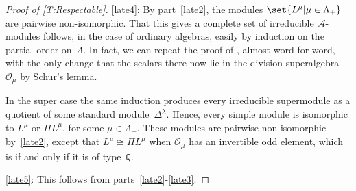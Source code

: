 \documentclass[a4paper,11pt]{amsart}
\numberwithin{equation}{subsection}
\theoremstyle{definition}
\theoremstyle{theorem}
\theoremstyle{remark}
\newcommand\CA{\mathcal{A}}
\newcommand\CO{\mathcal{O}}
\newcommand\Olam[1][\lambda]{\CO_{#1}}
\begin{document}
\begin{proof}[Proof of \autoref{T:Respectable}]
     \autoref{late4}: By part~\autoref{late2}, the modules $\set{L^\mu|\mu\in\Lambda_+}$ are
     pairwise non-isomorphic. That this gives a complete set of
     irreducible $\CA$-modules follows, in the case of ordinary
     algebras,  easily by induction on the partial
     order on~$\Lambda$. In fact, we can repeat the proof of
     \cite[Theorem~2.16]{Mathas:ULect}, almost word for word, with the only
     change that the scalars there now lie in the division
     superalgebra $\Olam[\mu]$ by Schur's lemma.

     In the super case the same induction produces every irreducible
     supermodule as a quotient of some standard module~$\Delta^\lambda$.
     Hence, every simple module is isomorphic to $L^\mu$ or $\Pi L^\mu$,
     for some $\mu\in\Lambda_+$. These modules are pairwise
     non-isomorphic by~\autoref{late2}, except that $L^\mu\cong\Pi
     L^\mu$ when $\Olam[\mu]$ has an invertible odd element, which is if
     and only if it is of type~$\mathtt{Q}$.

     \autoref{late5}: This follows from parts~\autoref{late2}-\autoref{late3}.


\end{proof}
\end{document}
